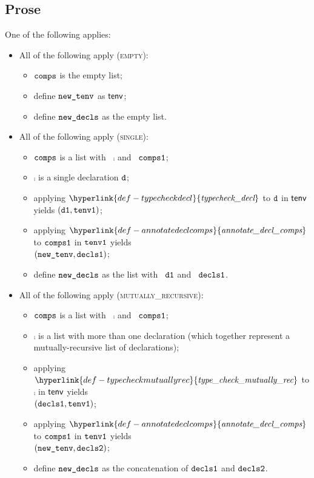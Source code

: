 \documentclass{book}
\newcommand\ProseOrTypeError[0]{\ProseTerminateAs{\TypeErrorConfig}}
\newcommand\typecheckdecl[0]{\hyperlink{def-typecheckdecl}{\textfunc{typecheck\_decl}}}
\newcommand\typecheckmutuallyrec[0]{\hyperlink{def-typecheckmutuallyrec}{\textfunc{type\_check\_mutually\_rec}}}
\newcommand\annotatedeclcomps[0]{\hyperlink{def-annotatedeclcomps}{\textfunc{annotate\_decl\_comps}}}
\begin{document}
\subsection{Prose}
One of the following applies:
\begin{itemize}
  \item All of the following apply (\textsc{empty}):
  \begin{itemize}
    \item $\texttt{comps}$ is the empty list;
    \item define $\texttt{new\_tenv}$ as $\textsf{tenv}$;
    \item define $\texttt{new\_decls}$ as the empty list.
  \end{itemize}

  \item All of the following apply (\textsc{single}):
  \begin{itemize}
    \item $\texttt{comps}$ is a list with \head\ $\comp$ and \tail\ $\texttt{comps1}$;
    \item $\comp$ is a single declaration $\texttt{d}$;
    \item applying $\typecheckdecl$ to $\texttt{d}$ in $\textsf{tenv}$ yields $(\texttt{d1}, \texttt{tenv1})$\ProseOrTypeError;
    \item applying $\annotatedeclcomps$ to $\texttt{comps1}$ in $\texttt{tenv1}$ yields \\ $(\texttt{new\_tenv}, \texttt{decls1})$\ProseOrTypeError;
    \item define $\texttt{new\_decls}$ as the list with \head\ $\texttt{d1}$ and \tail\ $\texttt{decls1}$.
  \end{itemize}

  \item All of the following apply (\textsc{mutually\_recursive}):
  \begin{itemize}
    \item $\texttt{comps}$ is a list with \head\ $\comp$ and \tail\ $\texttt{comps1}$;
    \item $\comp$ is a list with more than one declaration (which together represent a mutually-recursive
          list of declarations);
    \item applying $\typecheckmutuallyrec$ to $\comp$ in $\textsf{tenv}$ yields \\ $(\texttt{decls1}, \texttt{tenv1})$\ProseOrTypeError;
    \item applying $\annotatedeclcomps$ to $\texttt{comps1}$ in $\texttt{tenv1}$ yields \\ $(\texttt{new\_tenv}, \texttt{decls2})$\ProseOrTypeError;
    \item define $\texttt{new\_decls}$ as the concatenation of $\texttt{decls1}$ and $\texttt{decls2}$.
  \end{itemize}
\end{itemize}
\end{document}
